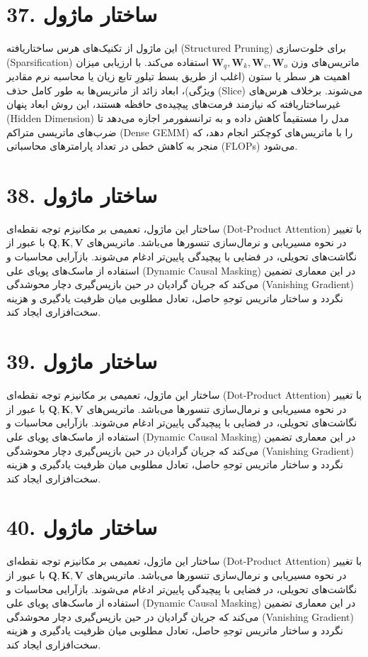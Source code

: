 \documentclass[12pt,a4paper]{report}
\begin{document}
\section*{37. ساختار ماژول }
این ماژول از تکنیک‌های هرس ساختاریافته (Structured Pruning) برای خلوت‌سازی (Sparsification) ماتریس‌های وزن $\mathbf{W}_q, \mathbf{W}_k, \mathbf{W}_v, \mathbf{W}_o$ استفاده می‌کند. با ارزیابی میزان اهمیت هر سطر یا ستون (اغلب از طریق بسط تیلورِ تابع زیان یا محاسبه نرم مقادیر ویژگی)، ابعاد زائد از ماتریس‌ها به طور کامل حذف (Slice) می‌شوند. برخلاف هرس‌های غیرساختاریافته که نیازمند فرمت‌های پیچیده‌ی حافظه هستند، این روش ابعاد پنهان (Hidden Dimension) مدل را مستقیماً کاهش داده و به ترانسفورمر اجازه می‌دهد تا ضرب‌های ماتریسی متراکم (Dense GEMM) را با ماتریس‌های کوچکتر انجام دهد، که منجر به کاهش خطی در تعداد پارامترهای محاسباتی (FLOPs) می‌شود.

\section*{38. ساختار ماژول }
ساختار این ماژول، تعمیمی بر مکانیزم توجه نقطه‌ای (Dot-Product Attention) با تغییر در نحوه مسیریابی و نرمال‌سازی تنسورها می‌باشد. ماتریس‌های $\mathbf{Q, K, V}$ با عبور از نگاشت‌های تحویلی، در فضایی با پیچیدگی پایین‌تر ادغام می‌شوند. بازآرایی محاسبات و استفاده از ماسک‌های پویای علی (Dynamic Causal Masking) در این معماری تضمین می‌کند که جریان گرادیان در حین بازپس‌گیری دچار محوشدگی (Vanishing Gradient) نگردد و ساختار ماتریس توجهِ حاصل، تعادل مطلوبی میان ظرفیت یادگیری و هزینه سخت‌افزاری ایجاد کند.

\section*{39. ساختار ماژول }
ساختار این ماژول، تعمیمی بر مکانیزم توجه نقطه‌ای (Dot-Product Attention) با تغییر در نحوه مسیریابی و نرمال‌سازی تنسورها می‌باشد. ماتریس‌های $\mathbf{Q, K, V}$ با عبور از نگاشت‌های تحویلی، در فضایی با پیچیدگی پایین‌تر ادغام می‌شوند. بازآرایی محاسبات و استفاده از ماسک‌های پویای علی (Dynamic Causal Masking) در این معماری تضمین می‌کند که جریان گرادیان در حین بازپس‌گیری دچار محوشدگی (Vanishing Gradient) نگردد و ساختار ماتریس توجهِ حاصل، تعادل مطلوبی میان ظرفیت یادگیری و هزینه سخت‌افزاری ایجاد کند.

\section*{40. ساختار ماژول }
ساختار این ماژول، تعمیمی بر مکانیزم توجه نقطه‌ای (Dot-Product Attention) با تغییر در نحوه مسیریابی و نرمال‌سازی تنسورها می‌باشد. ماتریس‌های $\mathbf{Q, K, V}$ با عبور از نگاشت‌های تحویلی، در فضایی با پیچیدگی پایین‌تر ادغام می‌شوند. بازآرایی محاسبات و استفاده از ماسک‌های پویای علی (Dynamic Causal Masking) در این معماری تضمین می‌کند که جریان گرادیان در حین بازپس‌گیری دچار محوشدگی (Vanishing Gradient) نگردد و ساختار ماتریس توجهِ حاصل، تعادل مطلوبی میان ظرفیت یادگیری و هزینه سخت‌افزاری ایجاد کند.
\end{document}
